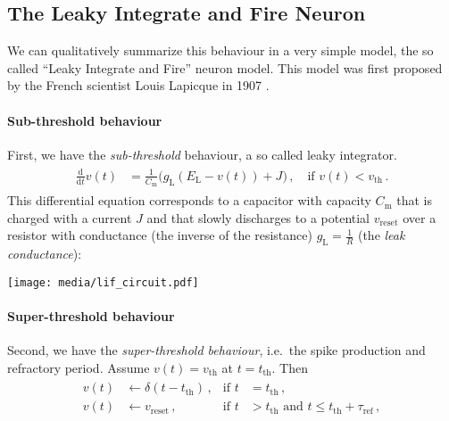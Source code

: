 \documentclass[10pt,letterpaper,oneside]{article}
\begin{document}
\newpage


\subsection{The Leaky Integrate and Fire Neuron}

We can qualitatively summarize this behaviour in a very simple model, the so called \enquote{Leaky Integrate and Fire} neuron model. This model was first proposed by the French scientist Louis Lapicque in 1907 \cite{lapicque1907recherches,abbott1999lapicque}.

\paragraph{Sub-threshold behaviour}
First, we have the \emph{sub-threshold} behaviour, a so called leaky integrator.
\begin{align}
	\begin{aligned}
		\frac{\mathrm{d}}{\mathrm{d}t} v(t) &= \frac{1}{C_\mathrm{m}} \big(g_\mathrm{L} (E_\mathrm{L} - v(t))
			+ J
		\big) \,, \quad \text{if } v(t) < v_\mathrm{th}\,.
	\end{aligned}
	\label{eqn:sub-threshold}
\end{align}
This differential equation corresponds to a capacitor with capacity $C_\mathrm{m}$ that is charged with a current $J$ and that slowly discharges to a potential $v_\mathrm{reset}$ over a resistor with conductance (the inverse of the resistance) $g_\mathrm{L} = \frac{1}{R}$ (the \emph{leak conductance}):
\begin{center}
	\hspace{2.5cm}\texttt{[image: media/lif\_circuit.pdf]}
\end{center}

\paragraph{Super-threshold behaviour}
Second, we have the \emph{super-threshold behaviour}, i.e.~the spike production and refractory period. Assume $v(t) = v_\mathrm{th}$ at $t = t_\mathrm{th}$. Then
\begin{align}
	\begin{aligned}
		v(t) &\gets \delta(t - t_\mathrm{th}) \,, &\text{if } t &= t_\mathrm{th} \,,\\
		v(t) &\gets v_\mathrm{reset} \,, &\text{if } t &> t_\mathrm{th} \text{ and } t \leq t_\mathrm{th} + \tau_\mathrm{ref} \,,
	\end{aligned}
	\label{eqn:super-threshold}
\end{align}
\end{document}
